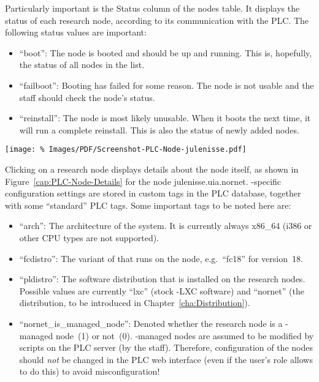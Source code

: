 Particularly important is the Status column of the nodes table. It displays the status of each research node, according to its communication with the PLC. The following status values are important:
\begin{itemize}
 \item ``boot'': The node is booted and should be up and running. This is, hopefully, the status of all nodes in the list.
 \item ``failboot'': Booting has failed for some reason. The node is not usable and the  staff should check the node's status.
 \item ``reinstall'': The node is most likely unusable. When it boots the next time, it will run a complete reinstall. This is also the status of newly added nodes.
\end{itemize}


\begin{figure*}
\begin{center}
\texttt{[image: \%
   Images/PDF/Screenshot-PLC-Node-julenisse.pdf]}
\end{center}
\caption{Nodes $\rightarrow$ Node julenisse.uia.nornet}
\label{cap:PLC-Node-Details}
\end{figure*}

Clicking on a research node displays details about the node itself, as shown in Figure~\ref{cap:PLC-Node-Details} for the node julenisse.uia.nornet. -specific configuration settings are stored in custom tags in the PLC database, together with some ``standard'' PLC tags. Some important tags to be noted here are:
\begin{itemize}
 \item ``arch'': The architecture of the system. It is currently always x86\_64 (i386 or other CPU types are not supported).

 \item ``fcdistro'': The variant of  that runs on the node, e.g.\ ``fc18'' for version~18.

 \item ``pldistro'': The software distribution that is installed on the research nodes. Possible values are currently ``lxc'' (stock -LXC software) and ``nornet'' (the  distribution, to be introduced in Chapter~\ref{cha:Distribution}).
 
 \item ``nornet\_is\_managed\_node'': Denoted whether the research node is a -managed node~(1) or not~(0). -managed nodes are assumed to be modified by scripts on the PLC server (by the  staff). Therefore, configuration of the nodes should \emph{not} be changed in the PLC web interface (even if the user's role allows to do this) to avoid misconfiguration!
\end{itemize}


